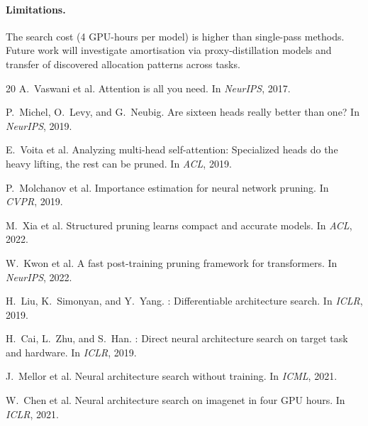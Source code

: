 \documentclass{article}
\begin{document}
\paragraph{Limitations.}  The search cost (4 GPU-hours per model) is
higher than single-pass methods.  Future work will investigate
amortisation via proxy-distillation models and transfer of discovered
allocation patterns across tasks.



% 

\begin{thebibliography}{20}
A.~Vaswani et al.
\newblock Attention is all you need.
\newblock In \emph{NeurIPS}, 2017.

P.~Michel, O.~Levy, and G.~Neubig.
\newblock Are sixteen heads really better than one?
\newblock In \emph{NeurIPS}, 2019.

E.~Voita et al.
\newblock Analyzing multi-head self-attention: Specialized heads do the heavy
  lifting, the rest can be pruned.
\newblock In \emph{ACL}, 2019.

P.~Molchanov et al.
\newblock Importance estimation for neural network pruning.
\newblock In \emph{CVPR}, 2019.

M.~Xia et al.
\newblock Structured pruning learns compact and accurate models.
\newblock In \emph{ACL}, 2022.

W.~Kwon et al.
\newblock A fast post-training pruning framework for transformers.
\newblock In \emph{NeurIPS}, 2022.

H.~Liu, K.~Simonyan, and Y.~Yang.
: Differentiable architecture search.
\newblock In \emph{ICLR}, 2019.

H.~Cai, L.~Zhu, and S.~Han.
: Direct neural architecture search on target task and
  hardware.
\newblock In \emph{ICLR}, 2019.

J.~Mellor et al.
\newblock Neural architecture search without training.
\newblock In \emph{ICML}, 2021.

W.~Chen et al.
\newblock Neural architecture search on imagenet in four {GPU} hours.
\newblock In \emph{ICLR}, 2021.


\end{thebibliography}
\end{document}

